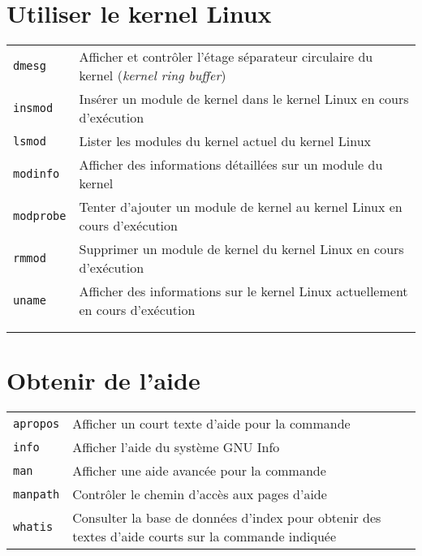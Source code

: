 \documentclass[10pt,a4paper]{article}
\begin{document}
\begin{multicols}{2}
\section{Utiliser le kernel Linux}
\begin{tabular}{ p{2.5cm} p{8.5cm} }
  \hline
  \texttt{dmesg} & Afficher et contrôler l'étage séparateur circulaire du kernel (\textit{kernel ring buffer})\\
  \rowcolor{Gray}
  \texttt{insmod} & Insérer un module de kernel dans le kernel Linux en cours d'exécution\\
  \texttt{lsmod} & Lister les modules du kernel actuel du kernel Linux\\
  \rowcolor{Gray}
  \texttt{modinfo} & Afficher des informations détaillées sur un module du kernel\\
  \texttt{modprobe} & Tenter d'ajouter un module de kernel au kernel Linux en cours d'exécution\\
  \rowcolor{Gray}
  \texttt{rmmod} & Supprimer un module de kernel du kernel Linux en cours d'exécution \\
  \texttt{uname} & Afficher des informations sur le kernel Linux actuellement en cours d'exécution\\
  \hline
  & \\
  & \\
\end{tabular}

\section{Obtenir de l'aide}
\begin{tabular}{ p{2.5cm} p{8.5cm} }
  \hline
  \texttt{apropos} & Afficher un court texte d'aide pour la commande \\
  \rowcolor{Gray}
  \texttt{info} & Afficher l'aide du système GNU Info \\
  \texttt{man} & Afficher une aide avancée pour la commande \\
  \rowcolor{Gray}
  \texttt{manpath} & Contrôler le chemin d'accès aux pages d'aide \\
  \texttt{whatis} & Consulter la base de données d'index pour obtenir des textes d'aide courts sur la commande indiquée \\
  \hline
\end{tabular}


\end{multicols}
\end{document}

